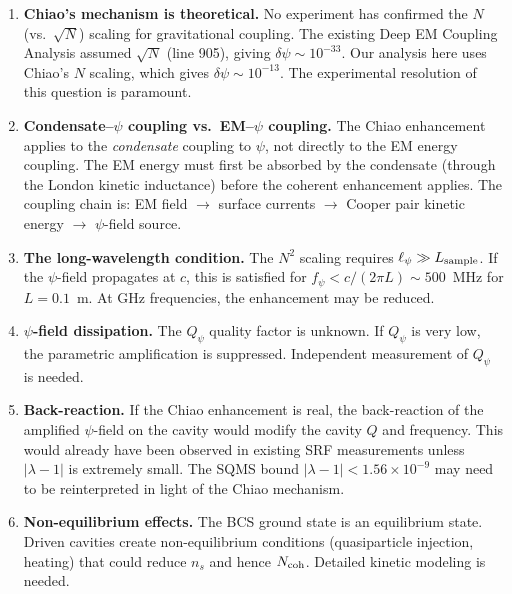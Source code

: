 \documentclass[12pt,aps,prd,twocolumn,superscriptaddress,nofootinbib]{revtex4-2}
\newcommand{\lam}{\lambda}
\newcommand{\ee}[1]{\times 10^{#1}}
\begin{document}
\begin{enumerate}
\item \textbf{Chiao's mechanism is theoretical.} No experiment has
confirmed the $N$ (vs.\ $\sqrt{N}$) scaling for gravitational
coupling. The existing Deep EM Coupling Analysis assumed $\sqrt{N}$
(line 905), giving $\delta\psi \sim 10^{-33}$. Our analysis here
uses Chiao's $N$ scaling, which gives $\delta\psi \sim 10^{-13}$.
The experimental resolution of this question is paramount.

\item \textbf{Condensate--$\psi$ coupling vs.\ EM--$\psi$ coupling.}
The Chiao enhancement applies to the \emph{condensate} coupling to
$\psi$, not directly to the EM energy coupling. The EM energy must
first be absorbed by the condensate (through the London kinetic
inductance) before the coherent enhancement applies. The coupling
chain is: EM field $\to$ surface currents $\to$ Cooper pair kinetic
energy $\to$ $\psi$-field source.

\item \textbf{The long-wavelength condition.} The $N^2$ scaling
requires $\ell_\psi \gg L_{\rm sample}$. If the $\psi$-field
propagates at $c$, this is satisfied for $f_\psi < c/(2\pi L)
\sim 500$~MHz for $L = 0.1$~m. At GHz frequencies, the enhancement
may be reduced.

\item \textbf{$\psi$-field dissipation.} The $Q_\psi$ quality factor
is unknown. If $Q_\psi$ is very low, the parametric amplification
is suppressed. Independent measurement of $Q_\psi$ is needed.

\item \textbf{Back-reaction.} If the Chiao enhancement is real, the
back-reaction of the amplified $\psi$-field on the cavity would
modify the cavity $Q$ and frequency. This would already have been
observed in existing SRF measurements unless $|\lam-1|$ is extremely
small. The SQMS bound $|\lam-1| < 1.56\ee{-9}$ may need to be
reinterpreted in light of the Chiao mechanism.

\item \textbf{Non-equilibrium effects.} The BCS ground state is an
equilibrium state. Driven cavities create non-equilibrium conditions
(quasiparticle injection, heating) that could reduce $n_s$ and hence
$N_{\rm coh}$. Detailed kinetic modeling is needed.
\end{enumerate}


\end{document}
